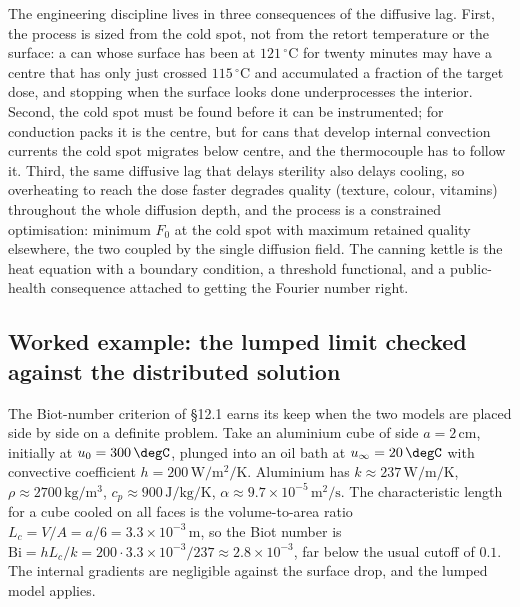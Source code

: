 The engineering discipline lives in three consequences of the
diffusive lag. First, the process is sized from the cold spot, not
from the retort temperature or the surface: a can whose surface has
been at $121\,{}^{\circ}\mathrm{C}$ for twenty minutes may have a
centre that has only just crossed $115\,{}^{\circ}\mathrm{C}$ and
accumulated a fraction of the target dose, and stopping when the
surface looks done underprocesses the interior. Second, the cold spot
must be found before it can be instrumented; for conduction packs it
is the centre, but for cans that develop internal convection currents
the cold spot migrates below centre, and the thermocouple has to
follow it. Third, the same diffusive lag that delays sterility also
delays cooling, so overheating to reach the dose faster degrades
quality (texture, colour, vitamins) throughout the whole diffusion
depth, and the process is a constrained optimisation: minimum $F_{0}$
at the cold spot with maximum retained quality elsewhere, the two
coupled by the single diffusion field. The canning kettle is the heat
equation with a boundary condition, a threshold functional, and a
public-health consequence attached to getting the Fourier number
right.

\subsection{Worked example: the lumped limit checked against the distributed solution}

The Biot-number criterion of §12.1 earns its keep when the two
models are placed side by side on a definite problem. Take an
aluminium cube of side $a = 2\,\si{\centi\meter}$, initially at
$u_{0} = 300\,\degC$, plunged into an oil bath at $u_{\infty} =
20\,\degC$ with convective coefficient $h = 200\,\si{\watt\per
\meter\squared\per\kelvin}$. Aluminium has $k \approx 237\,\si{
\watt\per\meter\per\kelvin}$, $\rho \approx 2700\,\si{\kilogram\per
\meter\cubed}$, $c_{p} \approx 900\,\si{\joule\per\kilogram\per
\kelvin}$, $\alpha \approx 9.7 \times 10^{-5}\,\si{\meter\squared
\per\second}$. The characteristic length for a cube cooled on all
faces is the volume-to-area ratio $L_{c} = V/A = a/6 = 3.3 \times
10^{-3}\,\si{\meter}$, so the Biot number is $\text{Bi} = h
L_{c}/k = 200 \cdot 3.3 \times 10^{-3}/237 \approx 2.8 \times
10^{-3}$, far below the usual cutoff of $0.1$. The internal
gradients are negligible against the surface drop, and the lumped
model applies.

